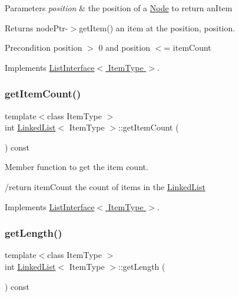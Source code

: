 \begin{DoxyParams}{Parameters}
{\em position} & the position of a \hyperlink{classNode}{Node} to return an\+Item \\
\hline
\end{DoxyParams}
\begin{DoxyReturn}{Returns}
node\+Ptr-\/$>$get\+Item() an item at the position, position. 
\end{DoxyReturn}
\begin{DoxyPrecond}{Precondition}
position $>$ 0 and position $<$= item\+Count 
\end{DoxyPrecond}


Implements \hyperlink{classListInterface_a86987f69e5056d287212ede41db1956a}{List\+Interface$<$ Item\+Type $>$}.

\mbox{\label{classLinkedList_afc6635f854f48f2f126cf3b60d845220}} 
\subsubsection{\texorpdfstring{get\+Item\+Count()}{getItemCount()}}
{\footnotesize\ttfamily template$<$class Item\+Type $>$ \\
int \hyperlink{classLinkedList}{Linked\+List}$<$ Item\+Type $>$\+::get\+Item\+Count (\begin{DoxyParamCaption}{ }\end{DoxyParamCaption}) const\hspace{0.3cm}{\ttfamily [virtual]}}



Member function to get the item count. 

/return item\+Count the count of items in the \hyperlink{classLinkedList}{Linked\+List} 

Implements \hyperlink{classListInterface_a3e085e6ea9c5dc3e8007010cd889159c}{List\+Interface$<$ Item\+Type $>$}.

\mbox{\label{classLinkedList_a61d045ef6008b494a1a516ecc992c0e7}} 
\subsubsection{\texorpdfstring{get\+Length()}{getLength()}}
{\footnotesize\ttfamily template$<$class Item\+Type $>$ \\
int \hyperlink{classLinkedList}{Linked\+List}$<$ Item\+Type $>$\+::get\+Length (\begin{DoxyParamCaption}{ }\end{DoxyParamCaption}) const\hspace{0.3cm}{\ttfamily [virtual]}}



